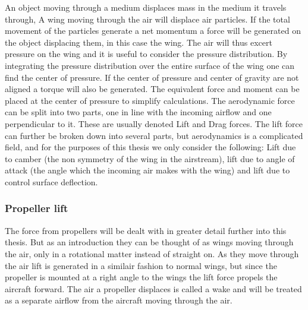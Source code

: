 An object moving through a medium displaces mass in the medium it travels through,
A wing moving through the air will displace air particles.
If the total movement of the particles generate a net momentum a force will be generated on the object displacing them, in this case the wing.
The air will thus excert pressure on the wing and it is useful to consider the pressure distribution.
By integrating the pressure distribution over the entire surface of the wing one can find the center of pressure.\cite{aerodynamics}
If the center of pressure and center of gravity are not aligned a torque will also be generated.
The equivalent force and moment can be placed at the center of pressure to simplify calculations.
The aerodynamic force can be split into two parts, one in line with the incoming airflow and one perpendicular to it.
These are usually denoted Lift and Drag forces.
The lift force can further be broken down into several parts, but aerodynamics is a complicated field, and for the purposes of this thesis we only consider the following:
Lift due to camber (the non symmetry of the wing in the airstream), lift due to angle of attack (the angle which the incoming air makes with the wing) and lift due to control surface deflection.

\subsubsection{Propeller lift}
The force from propellers will be dealt with in greater detail further into this thesis.
But as an introduction they can be thought of as wings moving through the air, only in a rotational matter instead of straight on. 
As they move through the air lift is generated in a similair fashion to normal wings, but since the propeller is mounted at a right angle to the wings the lift force propels the aircraft forward.
The air a propeller displaces is called a wake and will be treated as a separate airflow from the aircraft moving through the air.


